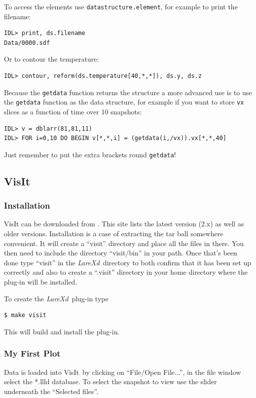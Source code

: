 \documentclass[11pt]{article}
\newcommand{\lare}{{\it LareXd}\ }
\newcommand{\visit}{VisIt\ }
\begin{document}
To access the elements use \texttt{datastructure.element}, for example to print the filename:
\begin{verbatim}
IDL> print, ds.filename
Data/0000.sdf
\end{verbatim}

Or to contour the temperature:
\begin{verbatim}
IDL> contour, reform(ds.temperature[40,*,*]), ds.y, ds.z
\end{verbatim}

Because the \texttt{getdata} function returns the structure a more advanced use is to use the \texttt{getdata} 
function as the data structure, for example if you want to store \texttt{vx} slices as a function of time over 10 snapshots:
\begin{verbatim}
IDL> v = dblarr(81,81,11)
IDL> FOR i=0,10 DO BEGIN v[*,*,i] = (getdata(i,/vx)).vx[*,*,40]
\end{verbatim}
Just remember to put the extra brackets round \texttt{getdata}!

\subsection{VisIt}
\subsubsection{Installation}
VisIt can be downloaded from \cite{visit}. This site lists the latest version (2.x) as well as older versions. 
Installation is a case of extracting the tar ball somewhere convenient. It will create a ``visit'' directory and 
place all the files in there. You then need to include the directory ``visit/bin'' in your path. Once that's been 
done type ``visit'' in the \lare directory to both confirm that it has been set up correctly and also to create a 
``.visit'' directory in your home directory where the plug-in will be installed.

To create the \lare plug-in type
\begin{verbatim}
$ make visit
\end{verbatim}

This will build and install the plug-in.

\subsubsection{My First Plot}
Data is loaded into \visit by clicking on ``File/Open File...'', in the file window select the *.llld database. 
To select the snapshot to view use the slider underneath the ``Selected files''.
\end{document}

